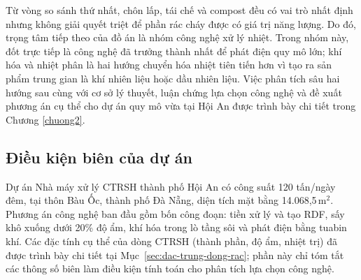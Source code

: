 \documentclass[../main.tex]{subfiles}
\begin{document}
Từ vòng so sánh thứ nhất, chôn lấp, tái chế và compost đều có vai trò nhất định nhưng không giải quyết triệt để phần rác cháy được có giá trị năng lượng. Do đó, trọng tâm tiếp theo của đồ án là nhóm công nghệ xử lý nhiệt. Trong nhóm này, đốt trực tiếp là công nghệ đã trưởng thành nhất để phát điện quy mô lớn; khí hóa và nhiệt phân là hai hướng chuyển hóa nhiệt tiên tiến hơn vì tạo ra sản phẩm trung gian là khí nhiên liệu hoặc dầu nhiên liệu. Việc phân tích sâu hai hướng sau cùng với cơ sở lý thuyết, luận chứng lựa chọn công nghệ và đề xuất phương án cụ thể cho dự án quy mô vừa tại Hội An được trình bày chi tiết trong Chương \ref{chuong2}.


\subsection{Điều kiện biên của dự án}

Dự án Nhà máy xử lý CTRSH thành phố Hội An có công suất 120 tấn/ngày đêm, tại thôn Bàu Ốc, thành phố Đà Nẵng, diện tích mặt bằng 14.068,5\,m$^2$. Phương án công nghệ ban đầu gồm bốn công đoạn: tiền xử lý và tạo RDF, sấy khô xuống dưới 20\% độ ẩm, khí hóa trong lò tầng sôi và phát điện bằng tuabin khí. Các đặc tính cụ thể của dòng CTRSH (thành phần, độ ẩm, nhiệt trị) đã được trình bày chi tiết tại Mục~\ref{sec:dac-trung-dong-rac}; phần này chỉ tóm tắt các thông số biên làm điều kiện tính toán cho phân tích lựa chọn công nghệ.
\end{document}
